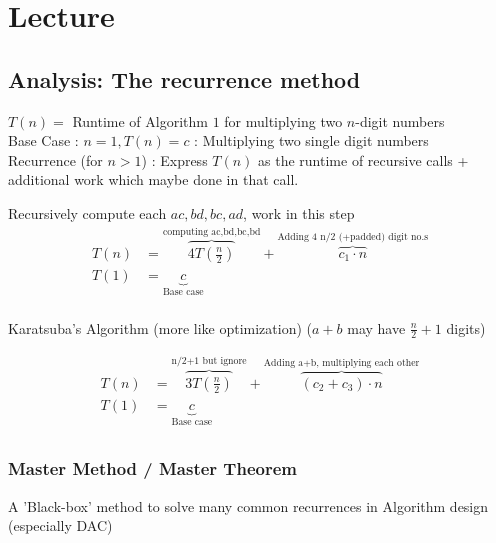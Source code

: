 \documentclass[a4paper
]{article}
\begin{document}
\hypertarget{lecture-2}{%
\section{Lecture}\label{lecture-2}}

\hypertarget{analysis-the-recurrence-method}{%
\subsection{Analysis: The recurrence
method}\label{analysis-the-recurrence-method}}

{\(T(n) =\)} Runtime of Algorithm {\(1\)} for multiplying two
{\(n\)}-digit numbers\\
Base Case : {\(n = 1,T(n) = c\)} : Multiplying two single digit
numbers\\
Recurrence (for {\(n > 1\)}) : Express {\(T(n)\)} as the runtime of
recursive calls + additional work which maybe done in that call.

Recursively compute each {\(ac,bd,bc,ad\)}, work in this step
{\[\begin{matrix}
{T(n)} & {= \overset{\text{computing\ ac,bd,bc,bd}}{\overbrace{4T\left( \frac{n}{2} \right)}} + \overset{\text{Adding\ 4\ n/2\ (+padded)\ digit\ no.s}}{\overbrace{c_{1} \cdot n}}} \\
{T(1)} & {= \underset{\text{Base\ case}}{\underbrace{c}}} \\
\end{matrix}\]}

Karatsuba's Algorithm (more like optimization) ({\(a + b\)} may have
{\(\frac{n}{2} + 1\)} digits)

\[\begin{matrix}
{T(n)} & {= \overset{\text{n/2+1\ but\ ignore}}{\overbrace{3T\left( \frac{n}{2} \right)}} + \overset{\text{Adding\ a+b,\ multiplying\ each\ other}}{\overbrace{(c_{2} + c_{3}) \cdot n}}} \\
{T(1)} & {= \underset{\text{Base\ case}}{\underbrace{c}}} \\
\end{matrix}\]

\hypertarget{master-method-master-theorem}{%
\subsubsection{Master Method / Master
Theorem}\label{master-method-master-theorem}}

A 'Black-box' method to solve many common recurrences in Algorithm
design (especially DAC)
\end{document}
